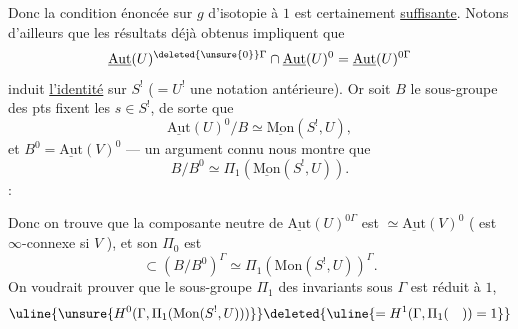 Donc la condition énoncée sur $g$ d'isotopie à $1$ est certainement
\uline{suffisante}. Notons d'ailleurs que les résultats déjà obtenus impliquent que
\[
\underline{\mathrm{Aut}}(U)^{\deleted{\unsure{0}}\Gamma}
\cap\underline{\mathrm{Aut}}(U)^0
=\underline{\mathrm{Aut}}(U)^{0\Gamma}
\]
induit \uline{l'identité} sur $S^!$ ($=U^!$  une notation antérieure).
Or  soit $B$
le sous-groupe des pts  fixent les $s\in S^!$, de sorte que
\[
\underline{\mathrm{Aut}}(U)^0/B\simeq\underline{\mathrm{Mon}}(S^!,U),
\]
et $B^0=\underline{\mathrm{Aut}}(V)^0$ --- un argument connu nous montre que
\[
B/B^0\simeq\Pi_1(\underline{\mathrm{Mon}}(S^!,U)).
\]
:


Donc on trouve que la composante neutre de
$\underline{\mathrm{Aut}}(U)^{0\Gamma}$ est $\simeq\underline{\mathrm{Aut}}(V)^0$
( est $\infty$-connexe si $V$ ), et son $\Pi_0$ est
\[
\subset(B/B^0)^\Gamma\simeq\Pi_1(\mathrm{Mon}(S^!,U))^\Gamma.
\]
On voudrait prouver que le sous-groupe   $\Pi_1$ des
invariants sous $\Gamma$ est réduit à $1$,
\[
\uline{\unsure{H^0(\Gamma,\Pi_1(\mathrm{Mon}(S^!,U)))}}
\deleted{\uline{=H^1(\Gamma,\Pi_1(\quad))=1}}
\]

